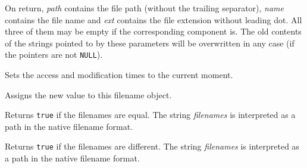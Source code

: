 On return, {\it path} contains the file path (without the trailing separator), 
{\it name} contains the file name and {\it ext} contains the file extension
without leading dot. All three of them may be empty if the corresponding
component is. The old contents of the strings pointed to by these parameters
will be overwritten in any case (if the pointers are not {\tt NULL}).


\label{wxfilenametouch}


Sets the access and modification times to the current moment.


\label{wxfilenameoperatorassign}



Assigns the new value to this filename object.


\label{wxfilenameoperatorequal}



Returns {\tt true} if the filenames are equal. The string {\it filenames} is
interpreted as a path in the native filename format.


\label{wxfilenameoperatornotequal}



Returns {\tt true} if the filenames are different. The string {\it filenames}
is interpreted as a path in the native filename format.

